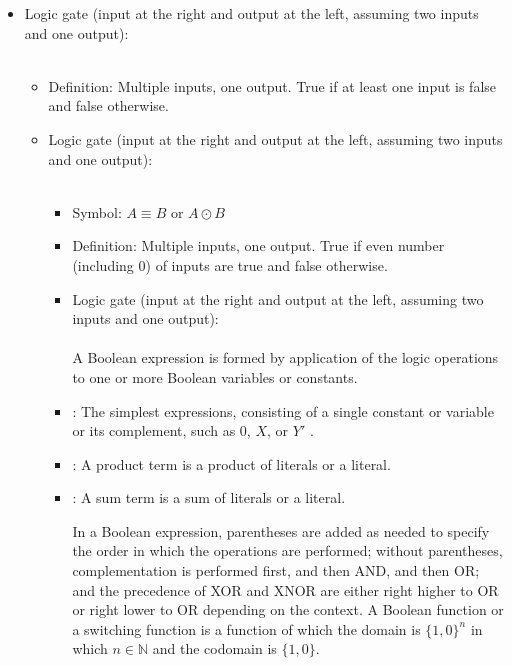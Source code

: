\documentclass[a4paper,12pt]{article}
\begin{document}
\begin{itemize}
\begin{itemize}
\begin{itemize}
\begin{itemize}
\begin{itemize}
\item Logic gate (input at the right and output at the left, assuming two inputs and one output):\\\mbox{}\\
\eit
{}
\begin{itemize}
\item Definition: Multiple inputs, one output. True if at least one input is false and false otherwise.
\item Logic gate (input at the right and output at the left, assuming two inputs and one output):\\\mbox{}\\
\eit
{}
\begin{itemize}
\item Symbol: $A\equiv B$ or $A\odot B$
\item Definition: Multiple inputs, one output. True if even number (including 0) of inputs are true and false otherwise.
\item Logic gate (input at the right and output at the left, assuming two inputs and one output):\\\mbox{}\\
\eit
{}
A Boolean expression is formed by application of the logic operations to one or more Boolean variables or constants. 

\bit
\item{}: The simplest expressions, consisting of a single constant or variable or its complement, such as $0$, $X$, or $Y′$ .
\item{}: A product term is a product of literals or a literal.
\item{}: A sum term is a sum of literals or a literal.
\eit

In a Boolean expression, parentheses are added as needed to specify the order in which the operations are performed; without parentheses, complementation is performed first, and then AND, and then OR; and the precedence of XOR and XNOR are either right higher to OR or right lower to OR depending on the context.
A Boolean function or a switching function is a function of which the domain is $\{1,0\}^n$ in which $n\in\mathbb{N}$ and the codomain is $\{1,0\}$.


\end{itemize}
\end{itemize}
\end{itemize}
\end{itemize}
\end{itemize}
\end{itemize}
\end{itemize}
\end{document}
